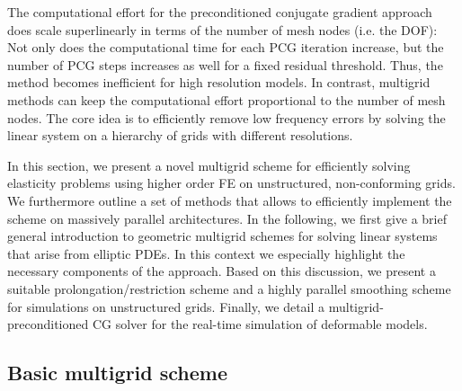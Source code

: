 The computational effort for the preconditioned conjugate gradient approach does scale superlinearly in terms of the number of mesh nodes (i.e. the DOF): Not only does the computational time for each PCG iteration increase, but the number of PCG steps increases as well for a fixed residual threshold. Thus, the method becomes inefficient for high resolution models. In contrast, multigrid methods can keep the computational effort proportional to the number of mesh nodes. The core idea is to efficiently remove low frequency errors by solving the linear system on a hierarchy of grids with different resolutions.

In this section, we present a novel multigrid scheme for efficiently solving elasticity problems using higher order FE on unstructured, non-conforming grids. We furthermore outline a set of methods that allows to efficiently implement the scheme on massively parallel architectures. In the following, we first give a brief general introduction to geometric multigrid schemes for solving linear systems that arise from elliptic PDEs. In this context we especially highlight the necessary components of the approach. Based on this discussion, we present a suitable prolongation/restriction scheme and a highly parallel smoothing scheme for simulations on unstructured grids. Finally, we detail a multigrid-preconditioned CG solver for the real-time simulation of deformable models.


\subsection{Basic multigrid scheme}

